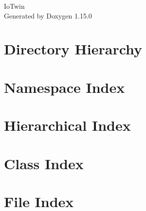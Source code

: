 \documentclass[twoside]{book}
\newcommand{\+}{\discretionary{\mbox{\scriptsize$\hookleftarrow$}}{}{}}
\newcommand{\clearemptydoublepage}{%
    \newpage{\pagestyle{empty}\cleardoublepage}%
  }
\begin{document}
  \raggedbottom
    \hypersetup{pageanchor=false,
                bookmarksnumbered=true,
                pdfencoding=unicode
               }
  \begin{titlepage}
  \vspace*{7cm}
  \begin{center}%
  {\Large Io\+Twin}\\
  \vspace*{1cm}
  {\large Generated by Doxygen 1.15.0}\\
  \end{center}
  \end{titlepage}
  \clearemptydoublepage
  \tableofcontents
  \clearemptydoublepage
  \hypersetup{pageanchor=true}
\chapter{Directory Hierarchy}

\chapter{Namespace Index}

\chapter{Hierarchical Index}

\chapter{Class Index}

\chapter{File Index}

\end{document}

